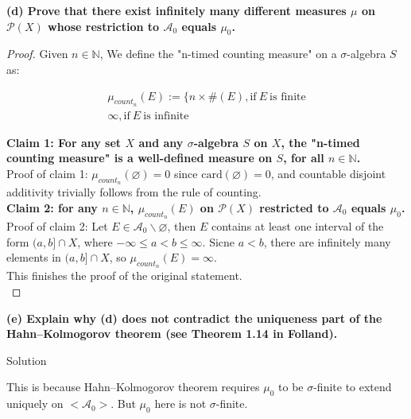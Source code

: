\documentclass{qlnotes-export}
\begin{document}
\textbf{(d) Prove that there exist infinitely many different measures \(\mu\) on \(\mathcal{P}(X)\) whose restriction to \(\mathcal{A}_{0}\) equals \(\mu_{0}\).}

\begin{proof}

Given \(n \in {\mathbb{N}}\), We define the "n-timed counting measure" on a \(\sigma\)-algebra \(S\) as:

\[\begin{matrix}
{\mu_{count_{n}}(E) := \{ n \times \#(E),\text{if}\ E\ \text{is finite}} \\
{\infty,\text{if}\ E\ \text{is infinite}}
\end{matrix}\]

\textbf{Claim 1: For any set \(X\) and any \(\sigma\)-algebra \(S\) on \(X\), the "n-timed counting measure" is a well-defined measure on \(S\), for all \(n \in {\mathbb{N}}\).}\\
Proof of claim 1: \(\mu_{count_{n}}(\varnothing) = 0\) since \(\text{card}(\varnothing) = 0\), and countable disjoint additivity trivially follows from the rule of counting.\\
\textbf{Claim 2: for any \(n \in {\mathbb{N}}\), \(\mu_{count_{n}}(E)\) on \(\mathcal{P}(X)\) restricted to \(\mathcal{A}_{0}\) equals \(\mu_{0}\).} Proof of claim 2: Let \(E \in \mathcal{A}_{0}\backslash\varnothing\), then \(E\) contains at least one interval of the form \((a,b\rbrack \cap X\), where \(- \infty \leq a < b \leq \infty\). Sicne \(a < b\), there are infinitely many elements in \((a,b\rbrack \cap X\), so \(\mu_{count_{n}}(E) = \infty\).\\
This finishes the proof of the original statement.\\

\end{proof}

\textbf{(e) Explain why (d) does not contradict the uniqueness part of the Hahn--Kolmogorov theorem (see Theorem 1.14 in Folland).}\\

\begin{qlsolution}{Solution}

This is because Hahn--Kolmogorov theorem requires \(\mu_{0}\) to be \(\sigma\)-finite to extend uniquely on \(< \mathcal{A}_{0} >\). But \(\mu_{0}\) here is not \(\sigma\)-finite.\\

\end{qlsolution}
\end{document}
